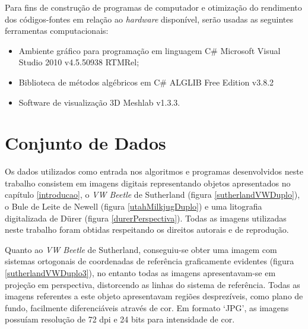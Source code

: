 	Para fins de construção de programas de computador e otimização do rendimento dos códigos-fontes em relação ao \textit{hardware} disponível, serão usadas as seguintes ferramentas computacionais:
\begin{itemize}
	\item Ambiente gráfico para programação em linguagem C\# Microsoft Visual Studio 2010 v4.5.50938 RTMRel\textregistered;
	\item Biblioteca de métodos algébricos em C\# ALGLIB Free Edition v3.8.2
	\item Software de visualização 3D Meshlab v1.3.3.
\end{itemize}

\section{Conjunto de Dados}
	\label{secaoConjuntoDeDados}

	Os dados utilizados como entrada nos algoritmos e programas desenvolvidos neste trabalho consistem em imagens digitais representando objetos apresentados no capítulo \ref{introducao}, o \textit{VW Beetle} de Sutherland (figura \ref{sutherlandVWDuplo}), o Bule de Leite de Newell (figura \ref{utahMilkjugDuplo}) e uma litografia digitalizada de Dürer (figura \ref{durerPerspectiva}). Todas as imagens utilizadas neste trabalho foram obtidas respeitando os direitos autorais e de reprodução.
	
	Quanto ao \textit{VW Beetle} de Sutherland, conseguiu-se obter uma imagem com sistemas ortogonais de coordenadas de referência graficamente evidentes (figura \ref{sutherlandVWDuplo3}), no entanto todas as imagens apresentavam-se em projeção em perspectiva, distorcendo as linhas do sistema de referência. Todas as imagens referentes a este objeto apresentavam regiões desprezíveis, como plano de fundo, facilmente diferenciáveis através de cor. Em formato `JPG', as imagens possuíam resolução de 72 dpi e 24 bits para intensidade de cor.

